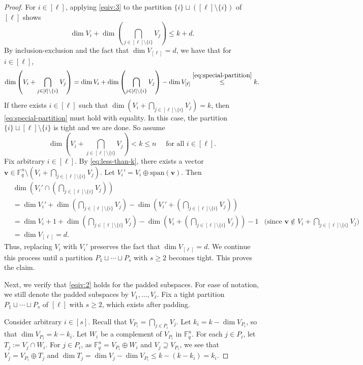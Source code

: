 \documentclass[11pt]{article}
\theoremstyle{plain}
\theoremstyle{definition}
\theoremstyle{remark}
\newcommand{\F}{\mathbb{F}}
\newcommand{\bv}{\bm{v}}
\begin{document}
\begin{proof}
For $i\in [\ell]$, applying \cref{eqiv:3} to the partition $\{i\}\sqcup ([\ell]\setminus \{i\})$ of $[\ell]$ shows
\begin{equation}\label{eq:special-partition}
\dim V_i+\dim\left(\bigcap_{j\in[\ell]\setminus\{i\}}V_j\right)\leq k+d.
\end{equation}
By inclusion-exclusion and the fact that $\dim V_{[\ell]}=d$, we have that for $i\in [\ell]$,
\[\dim\left( V_i+\bigcap_{j\in[\ell]\setminus\{i\}}V_j\right)=\dim V_i+\dim\left(\bigcap_{j\in[\ell]\setminus\{i\}}V_j\right)-\dim V_{[\ell]}\stackrel{\eqref{eq:special-partition}}{\leq} k.
\]
If there exists $i\in[\ell]$ such that $\dim\left( V_i+\bigcap_{j\in[\ell]\setminus\{i\}}V_j\right)=k$, then
\eqref{eq:special-partition} must hold with equality. In this case, the partition $\{i\}\sqcup[\ell]\setminus\{i\}$ is tight and we are done.
So assume
\begin{equation}\label{eq:less-than-k}
\dim\left( V_i+\bigcap_{j\in[\ell]\setminus\{i\}}V_j\right)<k\leq n \quad \text{ for all } i\in[\ell].
\end{equation}
Fix arbitrary $i\in[\ell]$. By \eqref{eq:less-than-k}, there exists a vector $\bv\in\F_q^n\setminus (V_{i}+\bigcap_{j\in[\ell]\setminus\{{i}\}}V_j)$. Let $V_i'=V_i \oplus \mathrm{span}(\bv)$.
Then
\begin{align*} &\dim\left(V_i'\cap\left(\bigcap_{j\in[\ell]\setminus\{i\}}V_j\right)\right)\\
&=\dim V_i'+\dim\left(\bigcap_{j\in[\ell]\setminus\{i\}}V_j\right)-\dim\left(V_i'+\left(\bigcap_{j\in[\ell]\setminus\{i\}}V_j\right)\right)\\
&=\dim V_i+1+\dim\left(\bigcap_{j\in[\ell]\setminus\{i\}}V_j\right)-\dim\left(V_i+\left(\bigcap_{j\in[\ell]\setminus\{i\}}V_j\right)\right)-1 & \text{(since $\bv\notin  V_i+\bigcap_{j\in[\ell]\setminus\{i\}}V_j$)}\\
&=\dim V_{[\ell]}=d.
\end{align*}
Thus, replacing $V_i$ with $V_i'$ preserves the fact that $\dim V_{[\ell]} = d$.
We continue this process until a partition $P_1\sqcup\cdots\sqcup P_s$ with $s\geq 2$ becomes tight. This proves the claim. 

Next, we verify that \cref{eqiv:2} holds for the padded subspaces. For ease of notation, we still denote the padded subspaces by $V_1,\dots,V_\ell$. 
Fix a tight partition  $P_1\sqcup \cdots\sqcup P_s$ of $[\ell]$ with $s\geq 2$, which exists after padding.

Consider arbitrary $i\in [s]$. 
Recall that $V_{P_i}=\bigcap_{j\in P_i}V_j$.
Let $k_i=k-\dim V_{P_i}$, so that $\dim V_{P_i}=k-k_i$.
Let $W_i$ be a complement of $V_{P_i}$ in $\F_q^n$. 
For each $j\in P_i$, 
let $T_j:=V_j\cap W_i$.
For $j\in P_i$,
as $\F_q^n=V_{P_i}\oplus W_i$ and $V_j\supseteq V_{P_i}$, we see that $V_j=V_{P_i}\oplus T_j$ and $\dim T_j = \dim V_j - \dim V_{P_i}\leq k-(k-k_i)=k_i$.



\end{proof}
\end{document}
